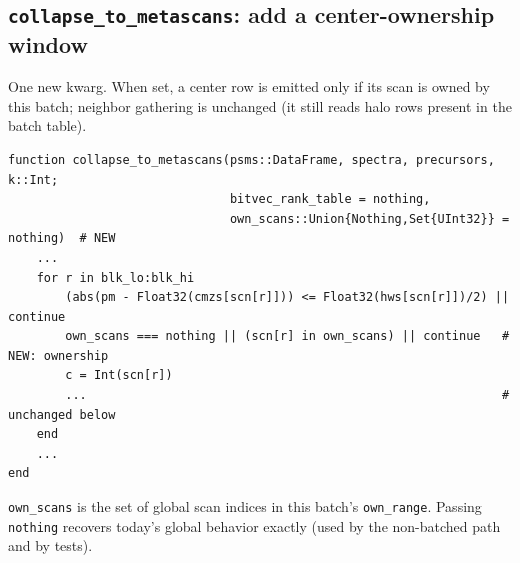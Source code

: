 \documentclass[11pt]{article}
\newcommand{\code}[1]{\texttt{\small #1}}
\begin{document}
\subsection{\code{collapse\_to\_metascans}: add a center-ownership window}
One new kwarg. When set, a center row is emitted only if its scan is owned by this batch;
neighbor gathering is unchanged (it still reads halo rows present in the batch table).
\begin{lstlisting}
function collapse_to_metascans(psms::DataFrame, spectra, precursors, k::Int;
                               bitvec_rank_table = nothing,
                               own_scans::Union{Nothing,Set{UInt32}} = nothing)  # NEW
    ...
    for r in blk_lo:blk_hi
        (abs(pm - Float32(cmzs[scn[r]])) <= Float32(hws[scn[r]])/2) || continue
        own_scans === nothing || (scn[r] in own_scans) || continue   # NEW: ownership
        c = Int(scn[r])
        ...                                                          # unchanged below
    end
    ...
end
\end{lstlisting}
\code{own\_scans} is the set of global scan indices in this batch's \code{own\_range}.
Passing \code{nothing} recovers today's global behavior exactly (used by the non-batched
path and by tests).
\end{document}
